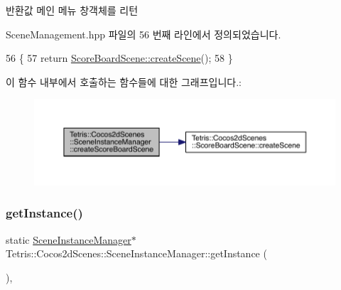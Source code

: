 \begin{DoxyReturn}{반환값}
메인 메뉴 창객체를 리턴 
\end{DoxyReturn}


Scene\+Management.\+hpp 파일의 56 번째 라인에서 정의되었습니다.


\begin{DoxyCode}
56                                              \{
57             \textcolor{keywordflow}{return} \hyperlink{class_tetris_1_1_cocos2d_scenes_1_1_score_board_scene_abedba06354b1f03d3f395e4c1841b8a6}{ScoreBoardScene::createScene}();
58         \}
\end{DoxyCode}
이 함수 내부에서 호출하는 함수들에 대한 그래프입니다.\+:
\nopagebreak
\begin{figure}[H]
\begin{center}
\leavevmode
\includegraphics[width=350pt]{d1/d6f/class_tetris_1_1_cocos2d_scenes_1_1_scene_instance_manager_a159ac191291a7cc3575d6f5790df6646_cgraph}
\end{center}
\end{figure}
\mbox{\label{class_tetris_1_1_cocos2d_scenes_1_1_scene_instance_manager_a0010e1efc6470cde661494631dc35b90}} 
\subsubsection{\texorpdfstring{get\+Instance()}{getInstance()}}
{\footnotesize\ttfamily static \hyperlink{class_tetris_1_1_cocos2d_scenes_1_1_scene_instance_manager}{Scene\+Instance\+Manager}$\ast$ Tetris\+::\+Cocos2d\+Scenes\+::\+Scene\+Instance\+Manager\+::get\+Instance (\begin{DoxyParamCaption}{ }\end{DoxyParamCaption})\hspace{0.3cm}{\ttfamily [inline]}, {\ttfamily [static]}}



